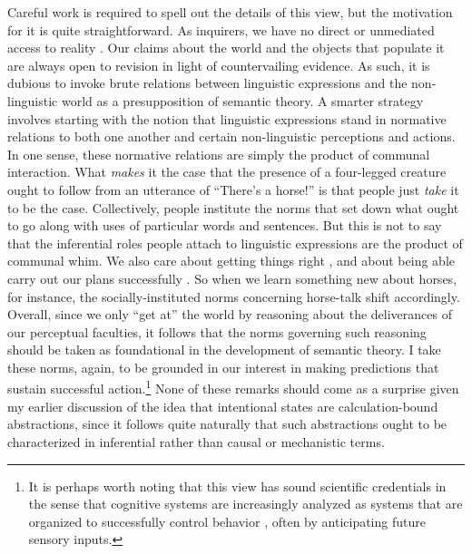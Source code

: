 Careful work is required to spell out the details of this view, but the motivation for it is quite straightforward. As inquirers, we have no direct or unmediated access to reality \citep{Misak:2013,Peirce:1992}. Our claims about the world and the objects that populate it are always open to revision in light of countervailing evidence. As such, it is dubious to invoke brute relations between linguistic expressions and the non-linguistic world as a presupposition of semantic theory. A smarter strategy involves starting with the notion that linguistic expressions stand in normative relations to both one another and certain non-linguistic perceptions and actions. In one sense, these normative relations are simply the product of communal interaction. What \textit{makes} it the case that the presence of a four-legged creature ought to follow from an utterance of  ``There's a horse!'' is that people just \textit{take} it to be the case. Collectively, people institute the norms that set down what ought to go along with uses of particular words and sentences. But this is not to say that the inferential roles people attach to linguistic expressions are the product of communal whim. We also care about getting things right \citep{Misak:2013}, and about being able carry out our plans successfully \citep{Whyte:1990}. So when we learn something new about horses, for instance, the socially-instituted norms concerning horse-talk shift accordingly. Overall, since we only ``get at'' the world by reasoning about the deliverances of our perceptual faculties, it follows that the norms governing such reasoning should be taken as foundational in the development of semantic theory. I take these norms, again, to be grounded in our interest in making predictions that sustain successful action.\footnote{It is perhaps worth noting that this view has sound scientific credentials in the sense that cognitive systems are increasingly analyzed as systems that are organized to successfully control behavior \citep[see e.g.,][]{Eliasmith:2003,Eliasmith:2013,clark:2013}, often by anticipating future sensory inputs.} None of these remarks should come as a surprise given my earlier discussion of the idea that intentional states are calculation-bound abstractions, since it follows quite naturally that such abstractions ought to be characterized in inferential rather than causal or mechanistic terms. 

